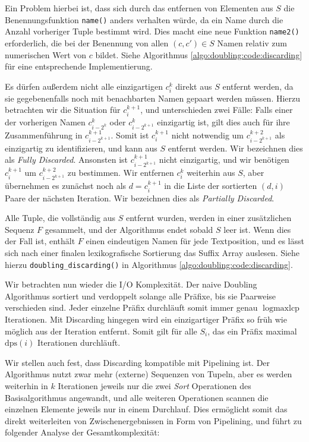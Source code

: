 Ein Problem hierbei ist, dass sich durch das entfernen von Elementen aus $S$ die Benennungsfunktion \texttt{name()} anders verhalten würde, da ein Name durch die Anzahl vorheriger Tuple bestimmt wird. Dies macht eine neue Funktion \texttt{name2()} erforderlich, die bei der Benennung von allen $(c, c') \in S$ Namen relativ zum numerischen Wert von $c$ bildet. Siehe Algorithmus \ref{algo:doubling:code:discarding} für eine entsprechende Implementierung.

Es dürfen außerdem nicht alle einzigartigen $c_i^k$ direkt aus $S$ entfernt werden, da sie gegebenenfalls noch mit benachbarten Namen gepaart werden müssen. Hierzu betrachten wir die Situation für $c_i^{k+1}$, und unterschieden zwei Fälle: Falls einer der vorherigen Namen $c_{i - 2^k}^k$ oder $c_{i - 2^{k+1}}^k$ einzigartig ist, gilt dies auch für ihre Zusammenführung in $c_{i - 2^{k+1}}^{k+1}$. Somit ist $c_i^{k+1}$ nicht notwendig um $c_{i - 2^{k+1}}^{k+2}$ als einzigartig zu identifizieren, und kann aus $S$ entfernt werden. Wir bezeichnen dies als \textit{Fully Discarded}. Ansonsten ist $c_{i - 2^{k+1}}^{k+1}$ nicht einzigartig, und wir benötigen $c_i^{k+1}$ um $c_{i - 2^{k+1}}^{k+2}$ zu bestimmen. Wir entfernen $c_i^k$ weiterhin aus $S$, aber übernehmen es zunächst noch als $d = c_i^{k+1}$ in die Liste der sortierten $(d, i)$ Paare der nächsten Iteration. Wir bezeichnen dies als \textit{Partially Discarded}.

Alle Tuple, die vollständig aus $S$ entfernt wurden, werden in einer zusätzlichen Sequenz $F$ gesammelt, und der Algorithmus endet sobald $S$ leer ist. Wenn dies der Fall ist, enthält $F$ einen eindeutigen Namen für jede Textposition, und es lässt sich nach einer finalen lexikografische Sortierung das Suffix Array auslesen. Siehe hierzu \texttt{doubling\_discarding()} in Algorithmus \ref{algo:doubling:code:discarding}.

Wir betrachten nun wieder die I/O Komplexität. Der naive Doubling Algorithmus sortiert und verdoppelt solange alle Präfixe, bis sie Paarweise verschieden sind. Jeder einzelne Präfix durchläuft somit immer genau $\log \text{maxlcp}$ Iterationen. Mit Discarding hingegen wird ein einzigartiger Präfix so früh wie möglich aus der Iteration entfernt. Somit gilt für alle $S_i$, das ein Präfix maximal $\text{dps}(i)$ Iterationen durchläuft.

Wir stellen auch fest, dass Discarding kompatible mit Pipelining ist. Der Algorithmus nutzt zwar mehr (externe) Sequenzen von Tupeln, aber es werden weiterhin in $k$ Iterationen jeweils nur die zwei \textit{Sort} Operationen des Basisalgorithmus angewandt, und alle weiteren Operationen scannen die einzelnen Elemente jeweils nur in einem Durchlauf. Dies ermöglicht somit das direkt weiterleiten von Zwischenergebnissen in Form von Pipelining, und führt zu folgender Analyse der Gesamtkomplexität:

